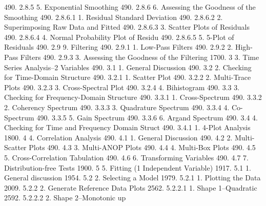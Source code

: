 490.      2.8.5                       5. Exponential Smoothing
490.      2.8.6                       6. Assessing the Goodness of the Smoothing
490.      2.8.6.1                           1. Residual Standard Deviation
490.      2.8.6.2                           2. Superimposing Raw Data and Fitted
490.      2.8.6.3                           3. Scatter Plots of Residuals
490.      2.8.6.4                           4. Normal Probability Plot of Residu
490.      2.8.6.5                           5. 5-Plot of Residuals
490.      2.9                   9. Filtering
490.      2.9.1                       1. Low-Pass Filters
490.      2.9.2                       2. High-Pass Filters
490.      2.9.3                       3. Assessing the Goodness of the Filtering
1700.     3               3. Time Series Analysis--2 Variables
490.      3.1                   1. General Discussion
490.      3.2                   2. Checking for Time-Domain Structure
490.      3.2.1                       1. Scatter Plot
490.      3.2.2                       2. Multi-Trace Plots
490.      3.2.3                       3. Cross-Spectral Plot
490.      3.2.4                       4. Bihistogram
490.      3.3                   3. Checking for Frequency-Domain Structure
490.      3.3.1                       1. Cross-Spectrum
490.      3.3.2                       2. Coherency Spectrum
490.      3.3.3                       3. Quadrature Spectrum
490.      3.3.4                       4. Co-Spectrum
490.      3.3.5                       5. Gain Spectrum
490.      3.3.6                       6. Argand Spectrum
490.      3.4                   4. Checking for Time and Frequency Domain Struct
490.      3.4.1                       1. 4-Plot Analysis
1800.     4               4. Correlation Analysis
490.      4.1                   1. General Discussion
490.      4.2                   2. Multi-Scatter Plots
490.      4.3                   3. Multi-ANOP Plots
490.      4.4                   4. Multi-Box Plots
490.      4.5                   5. Cross-Correlation Tabulation
490.      4.6                   6. Transforming Variables
490.      4.7                   7. Distribution-free Tests
1900.     5               5. Fitting (1 Independent Variable)
1917.     5.1                   1. General discussion
1954.     5.2                   2. Selecting a Model
1979.     5.2.1                       1. Plotting the Data
2009.     5.2.2                       2. Generate Reference Data Plots
2562.     5.2.2.1                           1. Shape 1--Quadratic
2592.     5.2.2.2                           2. Shape 2--Monotonic up
